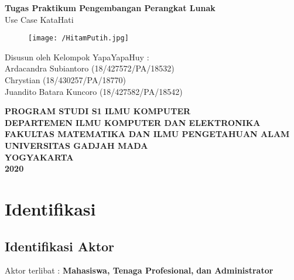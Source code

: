 \documentclass{article}
\begin{document}
	\begin{titlepage}
		\begin{center}
			
			\null
			{
				\huge \bfseries Tugas Praktikum Pengembangan Perangkat Lunak}\\
			[1cm]
			{\LARGE Use Case KataHati}\\
			
			\vspace{2cm}
			
			\begin{figure}[H]
				\centering
				\texttt{[image: /HitamPutih.jpg]}
			\end{figure}
			
			\vspace{3cm}
			
			{\Large 
				Disusun oleh Kelompok YapaYapaHuy} {\Large :\\
				\vspace{0.5cm}
				Ardacandra Subiantoro (18/427572/PA/18532)\\
				Chrystian (18/430257/PA/18770)\\
				Juandito Batara Kuncoro (18/427582/PA/18542)\\
			}
			
			
			\vspace{2cm}
			
			{\normalsize \bfseries
				PROGRAM STUDI S1 ILMU KOMPUTER\\
				DEPARTEMEN ILMU KOMPUTER DAN ELEKTRONIKA\\
				FAKULTAS MATEMATIKA DAN ILMU PENGETAHUAN ALAM\\
				UNIVERSITAS GADJAH MADA\\
				YOGYAKARTA\\
				\vspace{0.2cm}
				2020
			}
			
		\end{center}
	\end{titlepage}

	\newpage
	
	\section{Identifikasi}
	\subsection{Identifikasi Aktor}
	Aktor terlibat : \textbf{Mahasiswa, Tenaga Profesional,} \textbf{dan Administrator}
\end{document}

